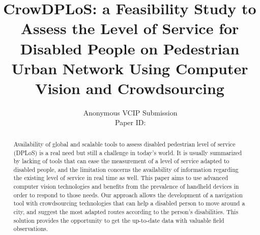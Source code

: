 \documentclass[10pt,conference,a4paper]{IEEEtran}
\title{CrowDPLoS: a Feasibility Study to Assess the Level of Service for Disabled People on Pedestrian Urban Network Using Computer Vision and Crowdsourcing}
\author{%
\,Anonymous VCIP Submission\\
\,Paper ID:

} %
\begin{document}
\maketitle

\begin{figure}[b]
\parbox{\hsize}{\em

}\end{figure}


\begin{abstract}
   Availability of global and scalable tools to assess disabled pedestrian level of service (DPLoS) is a real need but still a challenge in today’s world. It is usually summarized by lacking of tools that can ease the measurement of a level of service adapted to disabled people, and the limitation concerns the availability of information regarding the existing level of service in real time as well. This paper aims to use advanced computer vision technologies and benefits from the prevalence of handheld devices in order to respond to those needs. Our approach allows the development of a navigation tool with crowdsourcing technologies that can help a disabled person to move around a city, and suggest the most adapted routes according to the person’s disabilities. This solution provides the opportunity to get the up-to-date data with valuable field observations.
\\[1\baselineskip]
\end{abstract}

%

\end{document}
